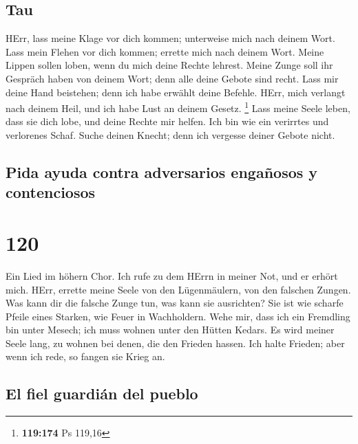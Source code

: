 \hypertarget{tau}{%
\subsection{Tau}\label{tau}}

 HErr, lass meine Klage vor dich kommen; unterweise mich
nach deinem Wort.  Lass mein Flehen vor dich kommen;
errette mich nach deinem Wort.  Meine Lippen sollen
loben, wenn du mich deine Rechte lehrest.  Meine Zunge
soll ihr Gespräch haben von deinem Wort; denn alle deine Gebote sind
recht.  Lass mir deine Hand beistehen; denn ich habe
erwählt deine Befehle.  HErr, mich verlangt nach deinem
Heil, und ich habe Lust an deinem Gesetz. \footnote{\textbf{119:174} Ps
  119,16}  Lass meine Seele leben, dass sie dich lobe,
und deine Rechte mir helfen.  Ich bin wie ein verirrtes
und verlorenes Schaf. Suche deinen Knecht; denn ich vergesse deiner
Gebote nicht.

\hypertarget{pida-ayuda-contra-adversarios-engauxf1osos-y-contenciosos}{%
\subsection{Pida ayuda contra adversarios engañosos y
contenciosos}\label{pida-ayuda-contra-adversarios-engauxf1osos-y-contenciosos}}

\hypertarget{section-119}{%
\section{120}\label{section-119}}

 Ein Lied im höhern Chor. Ich rufe zu dem HErrn in meiner
Not, und er erhört mich.  HErr, errette meine Seele von
den Lügenmäulern, von den falschen Zungen.  Was kann dir
die falsche Zunge tun, was kann sie ausrichten?  Sie ist
wie scharfe Pfeile eines Starken, wie Feuer in Wachholdern.
 Wehe mir, dass ich ein Fremdling bin unter Mesech; ich
muss wohnen unter den Hütten Kedars.  Es wird meiner Seele
lang, zu wohnen bei denen, die den Frieden hassen.  Ich
halte Frieden; aber wenn ich rede, so fangen sie Krieg an.

\hypertarget{el-fiel-guardiuxe1n-del-pueblo}{%
\subsection{El fiel guardián del
pueblo}\label{el-fiel-guardiuxe1n-del-pueblo}}

